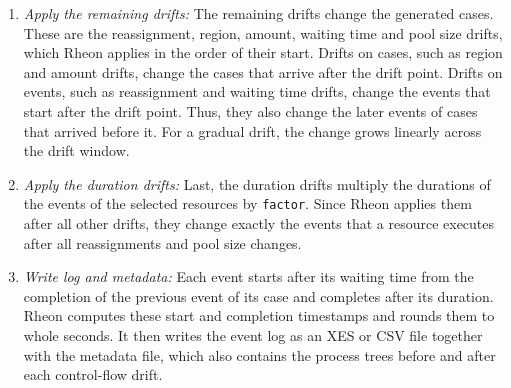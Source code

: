 \begin{enumerate}
    \item \emph{Apply the remaining drifts:} The remaining drifts change the generated cases. These are the reassignment, region, amount, waiting time and pool size drifts, which Rheon applies in the order of their start. Drifts on cases, such as region and amount drifts, change the cases that arrive after the drift point. Drifts on events, such as reassignment and waiting time drifts, change the events that start after the drift point. Thus, they also change the later events of cases that arrived before it. For a gradual drift, the change grows linearly across the drift window.

    \item \emph{Apply the duration drifts:} Last, the duration drifts multiply the durations of the events of the selected resources by \texttt{factor}. Since Rheon applies them after all other drifts, they change exactly the events that a resource executes after all reassignments and pool size changes.

    \item \emph{Write log and metadata:} Each event starts after its waiting time from the completion of the previous event of its case and completes after its duration. Rheon computes these start and completion timestamps and rounds them to whole seconds. It then writes the event log as an XES or CSV file together with the metadata file, which also contains the process trees before and after each control-flow drift.
\end{enumerate}

